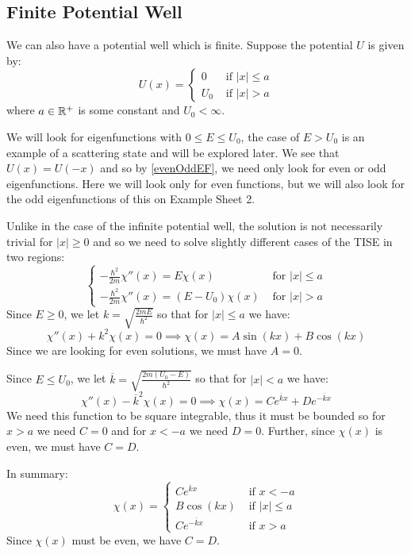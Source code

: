\documentclass[../main.tex]{subfiles}
\begin{document}
\subsection{Finite Potential Well} \label{finitePotWell}
We can also have a potential well which is finite.
Suppose the potential $U$ is given by:
\[
  U(x) = \begin{cases}
  0 & \text{ if } |x| \leq a \\
  U_0 & \text{ if } |x| > a
  \end{cases}
\]
where $a \in \mathbb{R}^{+}$ is some constant and $U_0 < \infty$.

We will look for eigenfunctions with $0 \leq E \leq U_0$, the case of $E > U_0$ is an example of a scattering state and will be explored later.
We see that $U(x) = U(-x)$ and so by \cref{evenOddEF}, we need only look for even or odd eigenfunctions.
Here we will look only for even functions, but we will also look for the odd eigenfunctions of this on Example Sheet 2.

Unlike in the case of the infinite potential well, the solution is not necessarily trivial for $|x| \geq 0$ and so we need to solve slightly different cases of the TISE in two regions:
\[
  \begin{cases}
  -\frac{\hbar^2}{2m}\chi''(x) = E \chi(x) & \text{ for } |x| \leq a \\
  -\frac{\hbar^2}{2m}\chi''(x) = (E - U_0)\chi(x) & \text{ for } |x| > a
  \end{cases}
\]
Since $E \geq 0$, we let $k = \sqrt{\frac{2mE}{\hbar^2}}$ so that for $|x| \leq a$ we have:
\[
  \chi''(x) + k^2 \chi(x) = 0 \implies \chi(x) = A \sin(kx) + B \cos(kx)
\]
Since we are looking for even solutions, we must have $A = 0$.

Since $E \leq U_0$, we let $\overline{k} = \sqrt{\frac{2m(U_0 - E)}{\hbar^2}}$ so that for $|x| < a$ we have:
\[
  \chi''(x) - \overline{k}^2 \chi(x) = 0 \implies \chi(x) = Ce^{\overline{k} x} + De^{-\overline{k} x}
\]
We need this function to be square integrable, thus it must be bounded so for $x > a$ we need $C = 0$ and for $x < -a$ we need $D = 0$.
Further, since $\chi(x)$ is even, we must have $C = D$.

In summary:
\[
  \chi(x) = \begin{cases}
  Ce^{\overline{k} x} & \text{ if } x < -a \\
  B\cos(kx) & \text{ if } |x| \leq a \\
  Ce^{-\overline{k} x} & \text{ if } x > a
  \end{cases}
\]
Since $\chi(x)$ must be even, we have $C = D$.
\end{document}
